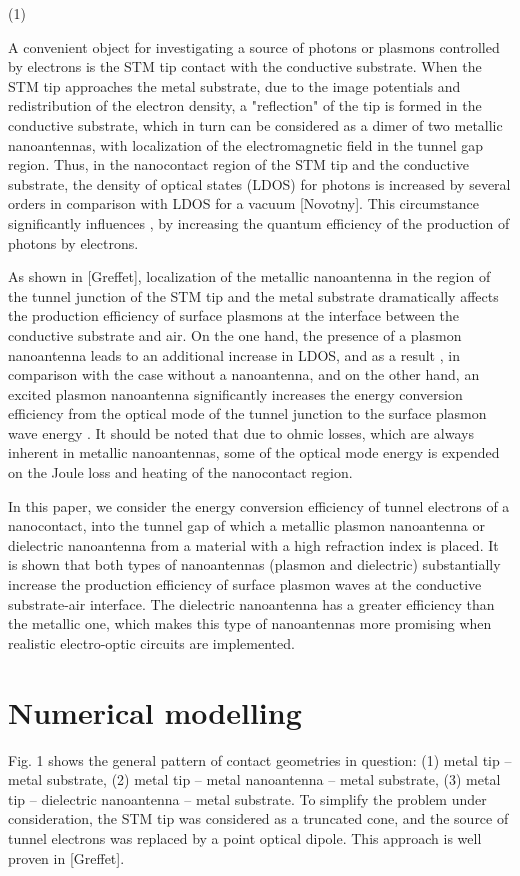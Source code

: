 \documentclass[%
 reprint,
 amsmath,amssymb,
prb,
]{revtex4-1}
\begin{document}
  (1)
  
A convenient object for investigating a source of photons or plasmons controlled by electrons is the STM tip contact with the conductive substrate. When the STM tip approaches the metal substrate, due to the image potentials and redistribution of the electron density, a "reflection" of the tip is formed in the conductive substrate, which in turn can be considered as a dimer of two metallic nanoantennas, with localization of the electromagnetic field in the tunnel gap region. Thus, in the nanocontact region of the STM tip and the conductive substrate, the density of optical states (LDOS) for photons is increased by several orders in comparison with LDOS for a vacuum [Novotny]. This circumstance significantly influences , by increasing the quantum efficiency of the production of photons by electrons.

As shown in [Greffet], localization of the metallic nanoantenna in the region of the tunnel junction of the STM tip and the metal substrate dramatically affects the production efficiency of surface plasmons at the interface between the conductive substrate and air. On the one hand, the presence of a plasmon nanoantenna leads to an additional increase in LDOS, and as a result , in comparison with the case without a nanoantenna, and on the other hand, an excited plasmon nanoantenna significantly increases the energy conversion efficiency from the optical mode of the tunnel junction to the surface plasmon wave energy . It should be noted that due to ohmic losses, which are always inherent in metallic nanoantennas, some of the optical mode energy is expended on the Joule loss and heating of the nanocontact region.

In this paper, we consider the energy conversion efficiency of tunnel electrons of a nanocontact, into the tunnel gap of which a metallic plasmon nanoantenna or dielectric nanoantenna from a material with a high refraction index is placed. It is shown that both types of nanoantennas (plasmon and dielectric) substantially increase the production efficiency of surface plasmon waves at the conductive substrate-air interface. The dielectric nanoantenna has a greater efficiency than the metallic one, which makes this type of nanoantennas more promising when realistic electro-optic circuits are implemented.



\section{\label{sec:numerical}Numerical modelling}
Fig. 1 shows the general pattern of contact geometries in question: (1) metal tip – metal substrate, (2) metal tip – metal nanoantenna – metal substrate, (3) metal tip – dielectric nanoantenna – metal substrate. To simplify the problem under consideration, the STM tip was considered as a truncated cone, and the source of tunnel electrons was replaced by a point optical dipole. This approach is well proven in [Greffet].
\end{document}
